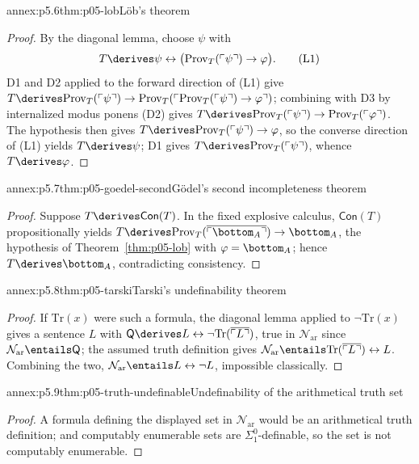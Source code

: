 

\begin{annexitem}{annex:p5.6}{thm:p05-lob}{L\"ob's theorem}
\begin{proof}
By the diagonal lemma, choose \(\psi\) with
\[
  T\derives\psi\leftrightarrow
  \bigl(\mathrm{Prov}_T(\ulcorner\psi\urcorner)\to\varphi\bigr).
  \tag{L1}
\]
D1 and D2 applied to the forward direction of (L1) give
\(T\derives\mathrm{Prov}_T(\ulcorner\psi\urcorner)\to
\mathrm{Prov}_T(\ulcorner\mathrm{Prov}_T(\ulcorner\psi\urcorner)
\to\varphi\urcorner)\); combining with D3 by internalized modus ponens
(D2) gives
\(T\derives\mathrm{Prov}_T(\ulcorner\psi\urcorner)\to
\mathrm{Prov}_T(\ulcorner\varphi\urcorner)\).  The hypothesis then
gives \(T\derives\mathrm{Prov}_T(\ulcorner\psi\urcorner)\to\varphi\),
so the converse direction of (L1) yields \(T\derives\psi\); D1 gives
\(T\derives\mathrm{Prov}_T(\ulcorner\psi\urcorner)\), whence
\(T\derives\varphi\).
\end{proof}
\end{annexitem}

\begin{annexitem}{annex:p5.7}{thm:p05-goedel-second}{G\"odel's second incompleteness theorem}
\begin{proof}
Suppose \(T\derives\mathsf{Con}(T)\).  In the fixed explosive calculus,
\(\mathsf{Con}(T)\) propositionally yields
\(T\derives\mathrm{Prov}_T(\overline{\ulcorner\bottom_A\urcorner})
\to\bottom_A\), the hypothesis of Theorem~\ref{thm:p05-lob} with
\(\varphi=\bottom_A\); hence \(T\derives\bottom_A\), contradicting
consistency.
\end{proof}
\end{annexitem}

\begin{annexitem}{annex:p5.8}{thm:p05-tarski}{Tarski's undefinability theorem}
\begin{proof}
If \(\mathrm{Tr}(x)\) were such a formula, the diagonal lemma applied
to \(\neg\mathrm{Tr}(x)\) gives a sentence \(L\) with
\(\mathsf Q\derives L\leftrightarrow
\neg\mathrm{Tr}(\overline{\ulcorner L\urcorner})\), true in
\(\mathcal N_{\mathrm{ar}}\) since \(\mathcal N_{\mathrm{ar}}\entails\mathsf Q\); the assumed truth
definition gives \(\mathcal N_{\mathrm{ar}}\entails
\mathrm{Tr}(\overline{\ulcorner L\urcorner})\leftrightarrow L\).
Combining the two, \(\mathcal N_{\mathrm{ar}}\entails L\leftrightarrow\neg L\),
impossible classically.
\end{proof}
\end{annexitem}

\begin{annexitem}{annex:p5.9}{thm:p05-truth-undefinable}{Undefinability of the arithmetical truth set}
\begin{proof}
A formula defining the displayed set in \(\mathcal N_{\mathrm{ar}}\) would be an
arithmetical truth definition; and computably enumerable sets are
\(\Sigma^0_1\)-definable, so the set is not computably enumerable.
\end{proof}
\end{annexitem}

